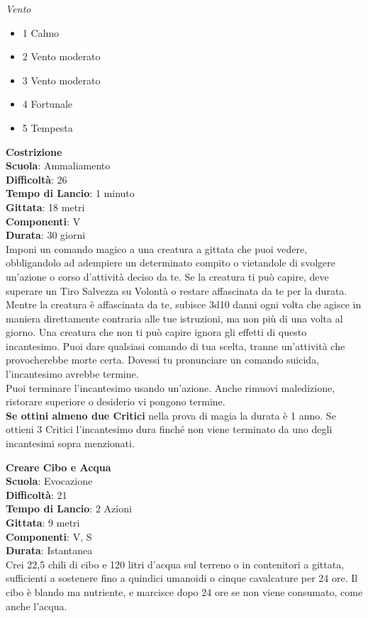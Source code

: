 \begin{multicols}{2}
\textit{Vento}
\begin{itemize}
	\item 
1 Calmo
	\item 
2 Vento moderato
	\item 
3 Vento moderato
	\item 
4 Fortunale
	\item 
5 Tempesta
\end{itemize}

\medskip\textbf{Costrizione}\\
\textbf{Scuola}: Ammaliamento\\
\textbf{Difficoltà}: 26\\
\textbf{Tempo di Lancio}: 1 minuto\\
\textbf{Gittata}: 18 metri\\
\textbf{Componenti}: V\\
\textbf{Durata}: 30 giorni\\
Imponi un comando magico a una creatura a gittata che puoi vedere, obbligandolo ad adempiere un determinato compito o vietandole di svolgere un'azione o corso d'attività deciso da te. Se la creatura ti può capire, deve superare un Tiro Salvezza su Volontà o restare affascinata da te per la durata. Mentre la creatura è affascinata da te, subisce 3d10 danni ogni volta che agisce in maniera direttamente contraria alle tue istruzioni, ma non più di una volta al giorno. Una creatura che non ti può capire ignora gli effetti di questo incantesimo. Puoi dare qualsiasi comando di tua scelta, tranne un'attività che provocherebbe morte certa. Dovessi tu pronunciare un comando suicida, l'incantesimo avrebbe termine.\\
Puoi terminare l'incantesimo usando un'azione. Anche rimuovi maledizione, ristorare superiore o desiderio vi pongono termine.\\
\textbf{Se ottini almeno due Critici} nella prova di magia la durata è 1 anno. Se ottieni 3 Critici l'incantesimo dura finché non viene terminato da uno degli incantesimi sopra menzionati.

\medskip\textbf{Creare Cibo e Acqua}\\
\textbf{Scuola}: Evocazione\\
\textbf{Difficoltà}: 21\\
\textbf{Tempo di Lancio}: 2 Azioni\\
\textbf{Gittata}: 9 metri\\
\textbf{Componenti}: V, S\\
\textbf{Durata}: Istantanea\\
Crei 22,5 chili di cibo e 120 litri d'acqua sul terreno o in contenitori a gittata, sufficienti a sostenere fino a quindici umanoidi o cinque cavalcature per 24 ore. Il cibo è blando ma nutriente, e marcisce dopo 24 ore se non viene consumato, come anche l'acqua.


\end{multicols}
